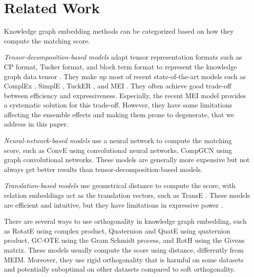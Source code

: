 \documentclass{article}
\theoremstyle{plain}
\theoremstyle{remark}
\begin{document}
\section{Related Work} \label{sect:relatedwork} Knowledge graph embedding methods can be categorized based on how they compute the matching score. 

\textit{Tensor-decomposition-based models} adapt tensor representation formats such as CP format, Tucker format, and block term format to represent the knowledge graph data tensor \cite{kolda_tensordecompositionsapplications_2009}. They make up most of recent state-of-the-art models such as ComplEx \cite{trouillon_complexembeddingssimple_2016}, SimplE \cite{kazemi_simpleembeddinglink_2018}, TuckER \cite{balazevic_tuckertensorfactorization_2019}, and MEI \cite{tran_multipartitionembeddinginteraction_2020}. They often achieve good trade-off between efficiency and expressiveness. Especially, the recent MEI model provides a systematic solution for this trade-off. However, they have some limitations affecting the ensemble effects and making them prone to degenerate, that we address in this paper.

\textit{Neural-network-based models} use a neural network to compute the matching score, such as ConvE \cite{dettmers_convolutional2dknowledge_2018} using convolutional neural networks, CompGCN \cite{vashishth_compositionbasedmultirelationalgraph_2020} using graph convolutional networks. These models are generally more expensive but not always get better results than tensor-decomposition-based models.

\textit{Translation-based models} use geometrical distance to compute the score, with relation embeddings act as the translation vectors, such as TransE \cite{bordes_translatingembeddingsmodeling_2013}. These models are efficient and intuitive, but they have limitations in expressive power \cite{kazemi_simpleembeddinglink_2018}. 

There are several ways to use orthogonality in knowledge graph embedding, such as RotatE \cite{sun_rotateknowledgegraph_2019} using complex product, Quaternion \cite{tran_analyzingknowledgegraph_2019} and QuatE \cite{zhang_quaternionknowledgegraph_2019} using quaternion product, GC-OTE \cite{tang_orthogonalrelationtransforms_2020} using the Gram Schmidt process, and RotH \cite{chami_lowdimensionalhyperbolicknowledge_2020} using the Givens matrix. These models usually compute the score using distance, differently from MEIM. Moreover, they use rigid orthogonality that is harmful on some datasets and potentially suboptimal on other datasets compared to soft orthogonality.
\end{document}
